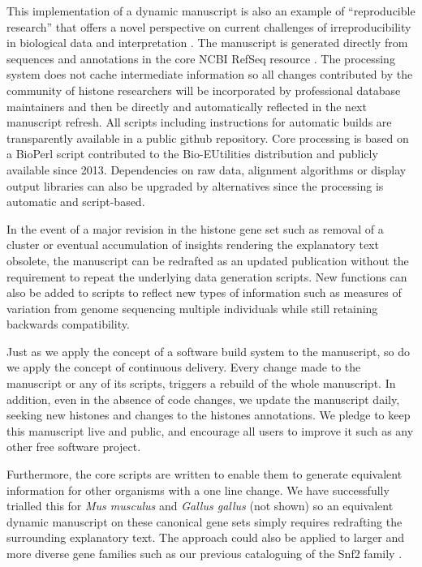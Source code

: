   This implementation of a dynamic manuscript
  is also an example of ``reproducible research''
  \citep{reproducible-research-bioinformatics,reproducible-research-law}
  that offers a novel perspective on
  current challenges of irreproducibility in biological data
  and interpretation \citep{ErrorProne2012,OpenPrograms2012}.
  The manuscript is generated directly from sequences and annotations
  in the core NCBI RefSeq resource \citep{PruittRefseq2014}.
  The processing system does not cache intermediate information so all changes contributed by
  the community of histone researchers will be incorporated by professional database maintainers
  and then be directly and automatically reflected in the next manuscript refresh.
  All scripts including instructions for automatic builds
  are transparently available in a public github repository.
  Core processing is based on a BioPerl script contributed to the Bio-EUtilities distribution
  and publicly available since 2013.
  Dependencies on raw data, alignment algorithms or display output libraries
  can also be upgraded by alternatives since the processing is automatic and script-based.

  In the event of a major revision in the histone gene set such as removal of a cluster
  or eventual accumulation of insights rendering the explanatory text obsolete,
  the manuscript can be redrafted as an updated publication
  without the requirement to repeat the underlying data generation scripts.
  New functions can also be added to scripts to reflect new types of information
  such as measures of variation from genome sequencing multiple individuals
  while still retaining backwards compatibility.

  Just as we apply the concept of a software build system to the
  manuscript, so do we apply the concept of continuous delivery.
  Every change made to the manuscript or any of its scripts,
  triggers a rebuild of the whole manuscript.  In addition, even
  in the absence of code changes, we update the manuscript daily,
  seeking new histones and changes to the histones annotations.
  We pledge to keep this manuscript live and public, and encourage
  all users to improve it such as any other free software project.

  Furthermore, the core scripts are written to enable them to generate
  equivalent information for other organisms with a one line change.
  We have successfully trialled this for \textit{Mus musculus}
  and \textit{Gallus gallus} (not shown)
  so an equivalent dynamic manuscript on these canonical gene sets
  simply requires redrafting the surrounding explanatory text.
  The approach could also be applied to larger and more diverse gene families such as
  our previous cataloguing of the Snf2 family \citep{andrew-snf2-catalogue}.

